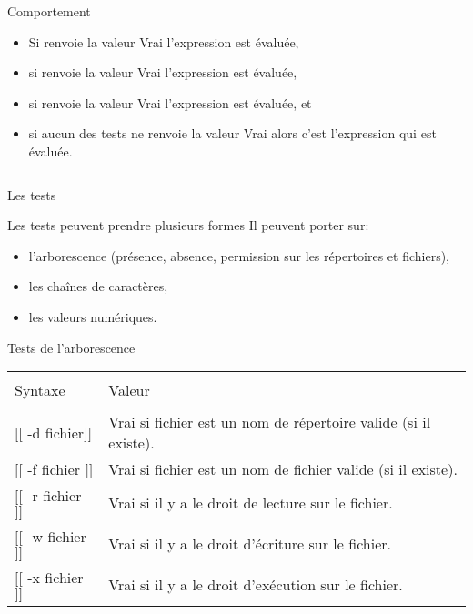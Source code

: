 \begin{frame}{}
\begin{columns}
\begin{column}{5cm}
\begin{block}{Comportement}
				\begin{itemize}
					\item Si  renvoie la valeur Vrai l'expression  est évaluée,\\
					\item si  renvoie la valeur Vrai l'expression  est évaluée,\\
					\item si  renvoie la valeur Vrai l'expression  est évaluée, et\\
					\item si aucun des tests ne renvoie la valeur Vrai alors c'est l'expression  qui est évaluée.
				\end{itemize}
			\end{block}
		\end{column}
	\end{columns}
\end{frame}
\begin{frame}{Les tests}
	\begin{block}{Les tests peuvent prendre plusieurs formes}
	Il peuvent porter sur:
		\begin{itemize}
			\item l'arborescence (présence, absence, permission sur les répertoires et fichiers),
			\item les chaînes de caractères,
			\item les valeurs numériques.
		\end{itemize}
	\end{block}
	\begin{block}{Tests de l'arborescence}
		\begin{center}
			\begin{tabular}{ll}
				\hline\\
				Syntaxe&Valeur\\
				\hline\\
				$[[$ -d fichier$]]$&Vrai si fichier est un nom de répertoire valide (si il existe).\\[3pt]
				$[[$ -f fichier $]]$&Vrai si fichier est un nom de fichier valide (si il existe).\\[3pt]
				$[[$ -r fichier $]]$&Vrai si il y a le droit de lecture sur le fichier.\\[3pt]
				$[[$ -w fichier$]]$&Vrai si il y a le droit d'écriture sur le fichier.\\[3pt]
				$[[$ -x fichier $]]$&Vrai si il y a le droit d'exécution sur le fichier.\\[3pt]
				\hline
			\end{tabular}
		\end{center}
	\end{block}
\end{frame}
